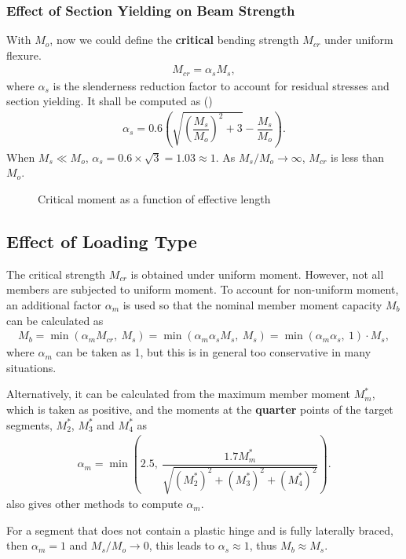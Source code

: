 \subsubsection{Effect of Section Yielding on Beam Strength}
With $M_o$, now we could define the \textbf{critical} bending strength $M_{cr}$ under uniform flexure.
\begin{gather}
M_{cr}=\alpha_sM_s,
\end{gather}
where $\alpha_s$ is the slenderness reduction factor to account for residual stresses and section yielding.
It shall be computed as ()
\begin{gather}
\alpha_s=0.6\left(\sqrt{\left(\dfrac{M_s}{M_o}\right)^2+3}-\dfrac{M_s}{M_o}\right).
\end{gather}
When $M_s\ll{}M_o$, $\alpha_s=0.6\times\sqrt{3}=1.03\approx1$.
As $M_s/M_o\rightarrow\infty$, $M_{cr}$ is less than $M_o$.
\begin{figure}[H]
\centering\caption{Critical moment as a function of effective length}
\end{figure}
\subsection{Effect of Loading Type}
The critical strength $M_{cr}$ is obtained under uniform moment.
However, not all members are subjected to uniform moment.
To account for non-uniform moment, an additional factor $\alpha_m$ is used so that the nominal member moment capacity $M_b$ can be calculated as
\begin{gather}
M_{b}=\min\left(\alpha_mM_{cr},~M_s\right)=\min\left(\alpha_m\alpha_sM_s,~M_s\right)=\min\left(\alpha_m\alpha_s,~1\right)\cdot{}M_s,
\end{gather}
where $\alpha_m$ can be taken as \num{1}, but this is in general too conservative in many situations.

Alternatively, it can be calculated from the maximum member moment $M^*_m$, which is taken as positive, and the moments at the \textbf{quarter} points of the target segments, $M^*_2$, $M^*_3$ and $M^*_4$ as
\begin{gather}
\alpha_m=\min\left(2.5,~\dfrac{1.7M^*_m}{\sqrt{\left(M^*_2\right)^2+\left(M^*_3\right)^2+\left(M^*_4\right)^2}}\right).
\end{gather}
 also gives other methods to compute $\alpha_m$.

For a segment that does not contain a plastic hinge and is fully laterally braced, then $\alpha_m=1$ and $M_s/M_o\rightarrow0$, this leads to $\alpha_s\approx1$, thus $M_b\approx{}M_s$.

